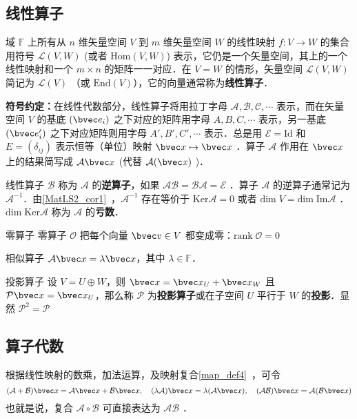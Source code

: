 
\subsection{线性算子}
域 $\mathbb{F}$ 上所有从 $n$ 维矢量空间 $V$ 到 $m$ 维矢量空间 $W$ 的线性映射 $f:V\rightarrow W$ 的集合用符号 $\mathcal{L}(V,W)$ (或者 $\mathrm{Hom}(V,W)$) 表示，它仍是一个矢量空间，其上的一个线性映射和一个 $m\times n$ 的矩阵一一对应．在 $V=W$ 的情形，矢量空间 $\mathcal{L}(V,W)$ 简记为 $\mathcal{L}(V)$ （或 $\mathrm{End}(V)$），它的向量通常称为\textbf{线性算子}．

\textbf{符号约定：}在线性代数部分，线性算子将用拉丁字母 $\mathcal{A,B,C,\cdots}$ 表示，而在矢量空间 $V$ 的基底 $(\bvec e_i)$ 之下对应的矩阵用字母 $A,B,C,\cdots$ 表示，另一基底 $(\bvec e_i')$ 之下对应矩阵则用字母 $A',B',C',\cdots$ 表示．总是用 $\mathcal{E}=\mathrm{Id}$ 和 $E=(\delta_{ij})$ 表示恒等（单位）映射 $\bvec x\mapsto \bvec x$ ．算子 $\mathcal{A}$ 作用在 $\bvec x$ 上的结果简写成 $\mathcal{A}\bvec x$ (代替 $\mathcal{A}(\bvec x)$ )．

线性算子 $\mathcal{B}$ 称为 $\mathcal{A}$ 的\textbf{逆算子}，如果 $\mathcal{AB}=\mathcal{BA}=\mathcal{E}$ ．算子 $\mathcal{A}$ 的逆算子通常记为 $\mathcal{A}^{-1}$．由\autoref{MatLS2_cor1}~，$\mathcal{A}^{-1}$ 存在等价于 $\mathrm{Ker}\mathcal{A}=0$ 或者 $\mathrm{dim}\;V=\mathrm{dim\;Im}\mathcal{A}$ ．$\mathrm{dim\;Ker}\mathcal{A}$ 称为 $\mathcal{A}$ 的\textbf{亏数}．
\begin{example}{零算子}\label{LiOper_ex1}
零算子 $\mathcal{O}$ 把每个向量 $\bvec v\in V$ 都变成零：$\mathrm{rank}\; \mathcal{O}=0$
\end{example}
\begin{example}{相似算子}
$\mathcal{A}\bvec x=\lambda\bvec x$，其中 $\lambda\in\mathbb{F}$．
\end{example}
\begin{example}{投影算子}
设 $V=U\oplus W$，则 $\bvec x=\bvec x_U+\bvec x_W$ 且 $\mathcal{P}\bvec x=\bvec x_U$，那么称 $\mathcal{P}$ 为\textbf{投影算子}或在子空间 $U$ 平行于 $W$ 的\textbf{投影}．显然 $\mathcal{P}^2=\mathcal{P}$
\end{example}
\subsection{算子代数}\label{LiOper_sub3}
根据线性映射的数乘，加法运算，及映射复合\autoref{map_def4}~，可令
\begin{equation}\label{LiOper_eq1}
(\mathcal{A}+\mathcal{B})\bvec x=\mathcal{A}\bvec x+\mathcal{B}\bvec x,\quad (\lambda\mathcal A)\bvec x=\lambda(\mathcal A\bvec x),\quad (\mathcal{AB})\bvec x=\mathcal{A}(\mathcal{B}\bvec x)
\end{equation}
也就是说，复合 $\mathcal{A\circ B}$ 可直接表达为 $\mathcal{AB}$ ．

